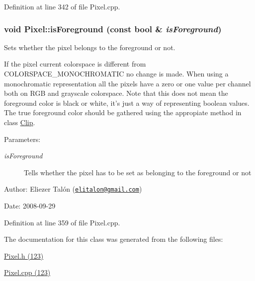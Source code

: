 Definition at line 342 of file Pixel.cpp.\hypertarget{class_pixel_d3007fd841eee762c9a1becc293f12db}{
\subsubsection[isForeground]{\setlength{\rightskip}{0pt plus 5cm}void Pixel::isForeground (const bool \& {\em isForeground})}}
\label{class_pixel_d3007fd841eee762c9a1becc293f12db}


Sets whether the pixel belongs to the foreground or not. 

If the pixel current colorspace is different from COLORSPACE\_\-MONOCHROMATIC no change is made. When using a monochromatic representation all the pixels have a zero or one value per channel both on RGB and grayscale colorspace. Note that this does not mean the foreground color is black or white, it's just a way of representing boolean values. The true foreground color should be gathered using the appropiate method in class \hyperlink{class_clip}{Clip}.

\begin{Desc}
\item[Parameters:]
\begin{description}
\item[{\em isForeground}]Tells whether the pixel has to be set as belonging to the foreground or not\end{description}
\end{Desc}
\begin{Desc}
\item[Author:]Eliezer Talón (\href{mailto:elitalon@gmail.com}{\tt elitalon@gmail.com}) \end{Desc}
\begin{Desc}
\item[Date:]2008-09-29 \end{Desc}


Definition at line 359 of file Pixel.cpp.

The documentation for this class was generated from the following files:\begin{CompactItemize}
\item 
\hyperlink{_pixel_8h}{Pixel.h (123)}\item 
\hyperlink{_pixel_8cpp}{Pixel.cpp (123)}\end{CompactItemize}
